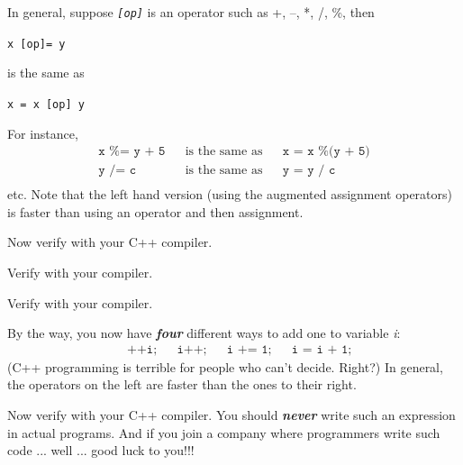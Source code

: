

In general, suppose \emph{\texttt{[op]}} is an operator such as +, --, *, /,
\%, then
\begin{center}
\texttt{x [op]= y}
\end{center}
is the same as
\begin{center}
\texttt{x = x [op] y}
\end{center}
For instance,
\begin{align*}
\texttt{x \%= y + 5} && \text{is the same as} && \texttt{x = x \% (y + 5)}\\
\texttt{y /= c} && \text{is the same as} && \texttt{y = y / c}\\
\end{align*}
etc. Note that the left hand version (using the augmented assignment
operators) is faster than using an operator and then assignment.


Now verify with your C++ compiler.


Verify with your compiler.



Verify with your compiler.



By the way, you now have \emph{\textbf{four}} different ways to add one
to variable \emph{i}:
\begin{align*}
&\texttt{++i;} &&\texttt{i++;} &&\texttt{i += 1;} &&\texttt{i = i + 1;}
\end{align*}
(C++ programming is terrible for people who can't decide. Right?) In general, the operators on the left are faster than the ones to their right.







Now verify with your C++ compiler. You should \emph{\textbf{never}} write such an expression in actual programs. And if you join a company where programmers write such code ... well ... good luck to you!!!





\newpage{}\\

